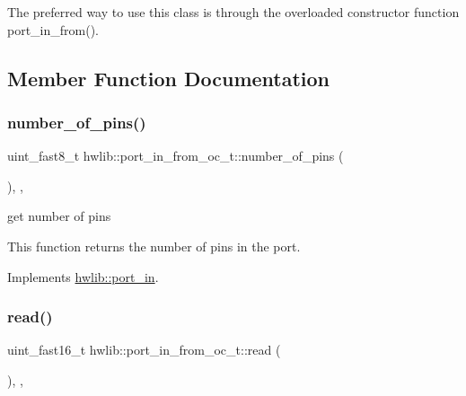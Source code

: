 The preferred way to use this class is through the overloaded constructor function port\+\_\+in\+\_\+from(). 

\subsection{Member Function Documentation}
\mbox{\label{classhwlib_1_1port__in__from__oc__t_a1b9fcc42a25a22ee96683c79a5b1b22c}} 
\subsubsection{\texorpdfstring{number\+\_\+of\+\_\+pins()}{number\_of\_pins()}}
{\footnotesize\ttfamily uint\+\_\+fast8\+\_\+t hwlib\+::port\+\_\+in\+\_\+from\+\_\+oc\+\_\+t\+::number\+\_\+of\+\_\+pins (\begin{DoxyParamCaption}{ }\end{DoxyParamCaption})\hspace{0.3cm}{\ttfamily [inline]}, {\ttfamily [override]}, {\ttfamily [virtual]}}





get number of pins

This function returns the number of pins in the port. 

Implements \hyperlink{classhwlib_1_1port__in_a3498fc0158e1e460a00d671df629fe22}{hwlib\+::port\+\_\+in}.

\mbox{\label{classhwlib_1_1port__in__from__oc__t_aaf875d99cf56fb579152a9977652f202}} 
\subsubsection{\texorpdfstring{read()}{read()}}
{\footnotesize\ttfamily uint\+\_\+fast16\+\_\+t hwlib\+::port\+\_\+in\+\_\+from\+\_\+oc\+\_\+t\+::read (\begin{DoxyParamCaption}{ }\end{DoxyParamCaption})\hspace{0.3cm}{\ttfamily [inline]}, {\ttfamily [override]}, {\ttfamily [virtual]}}





